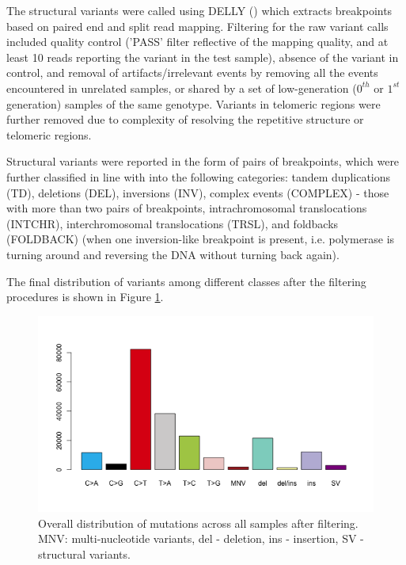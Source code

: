 The structural variants were called using DELLY (\cite{DELLY}) which extracts breakpoints based on
paired end and split read mapping. Filtering for the raw variant calls included quality control ('PASS'
filter reflective of the mapping quality, and at least 10 reads reporting the variant in the test
sample), absence of the variant in control, and removal of artifacts/irrelevant events by removing all
the events encountered in unrelated samples, or shared by a set of low-generation ($0^{th}$ or $1^{st}$
generation) samples of the same genotype. Variants in telomeric regions were further removed due to
complexity of resolving the repetitive structure or telomeric regions.

Structural variants were reported in the form of pairs of breakpoints, which were further classified 
in line with \cite{SV} into the following categories: tandem duplications (TD), deletions (DEL),
inversions (INV), complex events (COMPLEX) - those with more than two pairs of breakpoints, 
intrachromosomal translocations (INTCHR), interchromosomal translocations (TRSL), and foldbacks (FOLDBACK) (when one inversion-like breakpoint is present, i.e. polymerase is turning around and reversing the DNA without turning back again).

The final distribution of variants among different classes after the filtering procedures is shown in Figure \ref{mut_distr}.

\begin{figure}[h]
  \centerline{\includegraphics[scale = 0.6]{figures/Numbers_of_mutations.png}}
  \caption{Overall distribution of mutations across all samples after filtering. MNV: multi-nucleotide variants, del - deletion, ins - insertion, SV - structural variants.}
  \label{mut_distr}
\end{figure}


